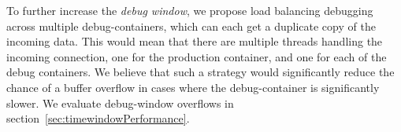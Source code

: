 To further increase the \emph{debug window}, we propose load balancing debugging across multiple debug-containers, which can each get a duplicate copy of the incoming data. 
This would mean that there are multiple threads handling the incoming connection, one for the production container, and one for each of the debug containers.
We believe that such a strategy would significantly reduce the chance of a buffer overflow in cases where the debug-container is significantly slower.
We evaluate debug-window overflows in section~\ref{sec:timewindowPerformance}.




